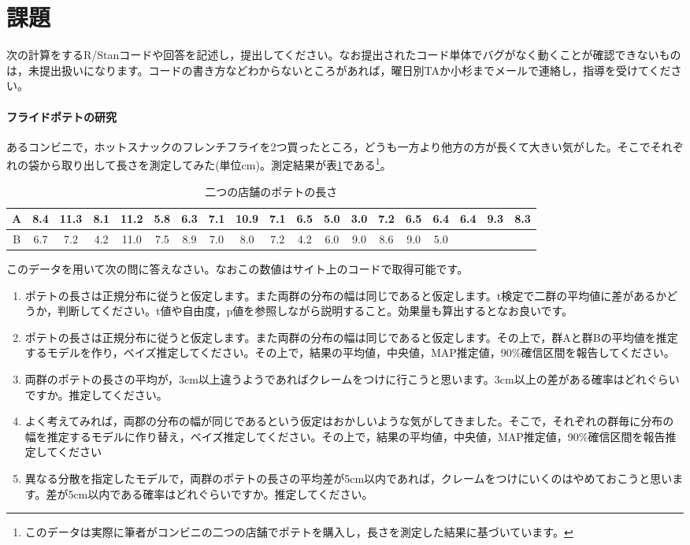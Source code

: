 \documentclass{ltjsbook}
\begin{document}
\section{課題}
次の計算をするR/Stanコードや回答を記述し，提出してください。なお提出されたコード単体でバグがなく動くことが確認できないものは，未提出扱いになります。コードの書き方などわからないところがあれば，曜日別TAか小杉までメールで連絡し，指導を受けてください。

\paragraph{フライドポテトの研究}
あるコンビニで，ホットスナックのフレンチフライを2つ買ったところ，どうも一方より他方の方が長くて大きい気がした。そこでそれぞれの袋から取り出して長さを測定してみた(単位cm)。測定結果が表\ref{tab::19_01}である\footnote{このデータは実際に筆者がコンビニの二つの店舗でポテトを購入し，長さを測定した結果に基づいています。}。
\begin{table}[ht]
    \center
    \caption{二つの店舗のポテトの長さ}
\begin{tabular}{c|cccccccccccccccccc}\hline
    A & 8.4 & 11.3 & 8.1 & 11.2 & 5.8 & 6.3 & 7.1 & 10.9 & 7.1 & 6.5 & 5.0 & 3.0 & 7.2 & 6.5 & 6.4 & 6.4 & 9.3 & 8.3 \\\hline
    B & 6.7 & 7.2 & 4.2 & 11.0 & 7.5 & 8.9 & 7.0 & 8.0 & 7.2 & 4.2 & 6.0 & 9.0 & 8.6 & 9.0 & 5.0 &  &  &  \\\hline
\end{tabular}
\label{tab::19_01}
\end{table}
このデータを用いて次の問に答えなさい。なおこの数値はサイト上のコードで取得可能です。
\begin{enumerate}
    \item ポテトの長さは正規分布に従うと仮定します。また両群の分布の幅は同じであると仮定します。t検定で二群の平均値に差があるかどうか，判断してください。t値や自由度，p値を参照しながら説明すること。効果量も算出するとなお良いです。
    \item ポテトの長さは正規分布に従うと仮定します。また両群の分布の幅は同じであると仮定します。その上で，群Aと群Bの平均値を推定するモデルを作り，ベイズ推定してください。その上で，結果の平均値，中央値，MAP推定値，90\%確信区間を報告してください。
    \item 両群のポテトの長さの平均が，3cm以上違うようであればクレームをつけに行こうと思います。3cm以上の差がある確率はどれぐらいですか。推定してください。
    \item よく考えてみれば，両郡の分布の幅が同じであるという仮定はおかしいような気がしてきました。そこで，それぞれの群毎に分布の幅を推定するモデルに作り替え，ベイズ推定してください。その上で，結果の平均値，中央値，MAP推定値，90\%確信区間を報告推定してください
    \item 異なる分散を指定したモデルで，両群のポテトの長さの平均差が5cm以内であれば，クレームをつけにいくのはやめておこうと思います。差が5cm以内である確率はどれぐらいですか。推定してください。
\end{enumerate}
\end{document}
